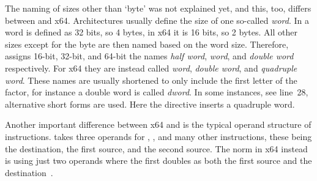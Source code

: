 The naming of sizes other than `byte' was not explained yet, and this, too, differs between \riscv{} and x64.
Architectures usually define the size of one so-called \emph{word}.
In \riscv{} a word is defined as 32 bits, so 4 bytes, in x64 it is 16 bits, so 2 bytes.
All other sizes except for the byte are then named based on the word size.
Therefore, \riscv{} assigns 16-bit, 32-bit, and 64-bit the names \emph{half word}, \emph{word}, and \emph{double word} respectively.
For x64 they are instead called \emph{word}, \emph{double word}, and \emph{quadruple word}.
These names are usually shortened to only include the first letter of the factor, for instance a double word is called \emph{dword}.
In some instances, see line~28, alternative short forms are used.
Here the directive  inserts a quadruple word.

Another important difference between x64 and \riscv{} is the typical operand structure of instructions.
\riscv{} takes three operands for , , and many other instructions, these being the destination, the first source, and the second source.
The norm in x64 instead is using just two operands where the first doubles as both the first source and the destination~\cite[pp.~14--20]{Dandamudi2005Risc}.


